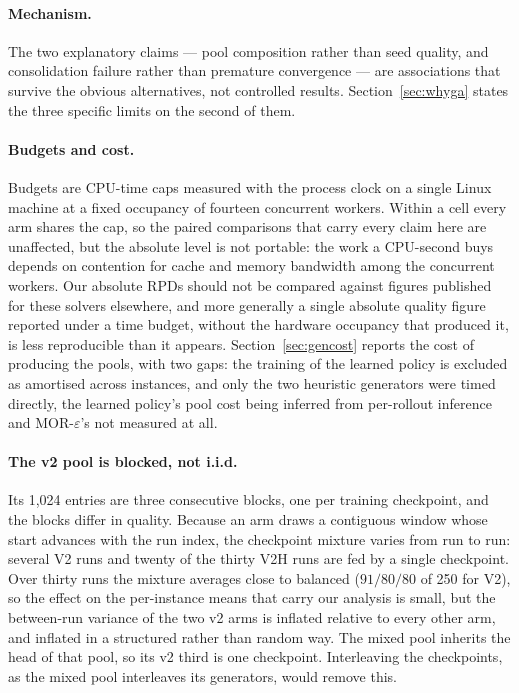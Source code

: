 \documentclass[review]{elsarticle}
\begin{document}
\paragraph{Mechanism.} The two explanatory claims --- pool composition
rather than seed quality, and consolidation failure rather than premature
convergence --- are associations that survive the obvious alternatives, not
controlled results. Section~\ref{sec:whyga} states the three specific
limits on the second of them.

\paragraph{Budgets and cost.} Budgets are CPU-time caps measured with the
process clock on a single Linux machine at a fixed occupancy of fourteen
concurrent workers. Within a cell every arm shares the cap, so the paired
comparisons that carry every claim here are unaffected, but the absolute
level is not portable: the work a CPU-second buys depends on contention for
cache and memory bandwidth among the concurrent workers. Our absolute RPDs
should not be compared against figures published for these solvers
elsewhere, and more generally a single absolute quality figure reported
under a time budget, without the hardware occupancy that produced it, is
less reproducible than it appears. Section~\ref{sec:gencost} reports the
cost of producing the pools, with two gaps: the training of the learned
policy is excluded as amortised across instances, and only the two
heuristic generators were timed directly, the learned policy's pool cost
being inferred from per-rollout inference and MOR-$\varepsilon$'s not
measured at all.

\paragraph{The v2 pool is blocked, not i.i.d.} Its 1{,}024 entries are three
consecutive blocks, one per training checkpoint, and the blocks differ in
quality. Because an arm draws a contiguous window whose start advances with
the run index, the checkpoint mixture varies from run to run: several V2
runs and twenty of the thirty V2H runs are fed by a single checkpoint. Over
thirty runs the mixture averages close to balanced ($91/80/80$ of 250 for
V2), so the effect on the per-instance means that carry our analysis is
small, but the between-run variance of the two v2 arms is inflated relative
to every other arm, and inflated in a structured rather than random way. The
mixed pool inherits the head of that pool, so its v2 third is one
checkpoint. Interleaving the checkpoints, as the mixed pool interleaves its
generators, would remove this.
\end{document}
